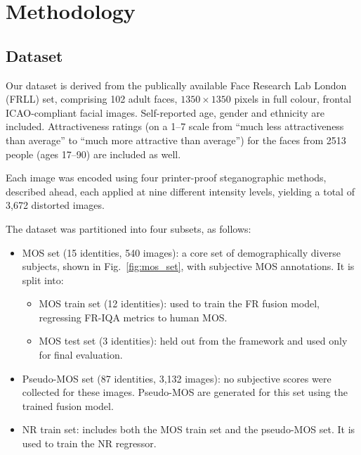 \chapter{Methodology}\label{chap:methodology}

\section{Dataset}

Our dataset is derived from the publically available Face Research Lab London~\cite{frll} (FRLL) set, comprising 102 adult faces, $1350 \times 1350$ pixels in full colour, frontal ICAO-compliant facial images. Self-reported age, gender and ethnicity are included. Attractiveness ratings (on a 1--7 scale from ``much less attractiveness than average'' to ``much more attractive than average'') for the faces from 2513 people (ages 17--90) are included as well.

Each image was encoded using four printer-proof steganographic methods, described ahead, each applied at nine different intensity levels, yielding a total of 3,672 distorted images.

The dataset was partitioned into four subsets, as follows:

\begin{itemize}
    \item MOS set (15 identities, 540 images): a core set of demographically diverse subjects, shown in Fig.~\ref{fig:mos_set}, with subjective MOS annotations. It is split into:
    \begin{itemize}
        \item MOS train set (12 identities): used to train the FR fusion model, regressing FR-IQA metrics to human MOS.\@
        \item MOS test set (3 identities): held out from the framework and used only for final evaluation.
    \end{itemize}
    \item Pseudo-MOS set (87 identities, 3,132 images): no subjective scores were collected for these images. Pseudo-MOS are generated for this set using the trained fusion model.
    \item NR train set: includes both the MOS train set and the pseudo-MOS set. It is used to train the NR regressor.
\end{itemize}

